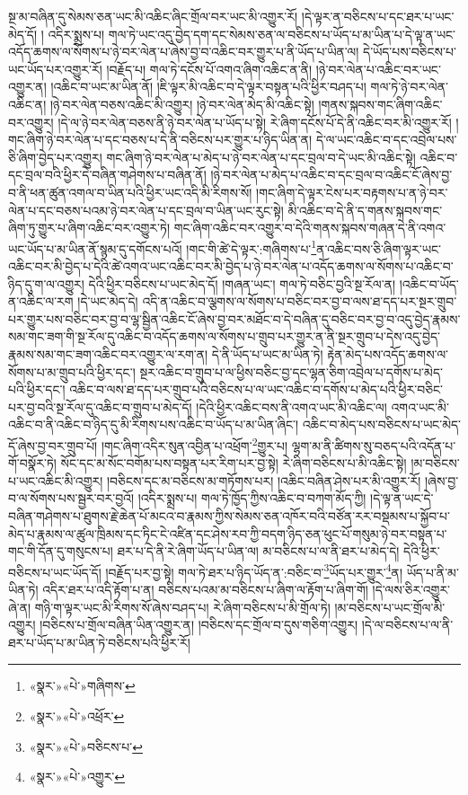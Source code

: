 སྔ་མ་བཞིན་དུ་སེམས་ཅན་ཡང་མི་འཆིང་ཞིང་གྲོལ་བར་ཡང་མི་འགྱུར་རོ། །དེ་ལྟར་ན་བཅིངས་པ་དང་ཐར་པ་ཡང་མེད་དོ། །
འདིར་སྨྲས་པ། གལ་ཏེ་ཡང་འདུ་བྱེད་དག་དང་སེམས་ཅན་ལ་བཅིངས་པ་ཡོད་པ་མ་ཡིན་པ་དེ་ལྟ་ན་ཡང་འདོད་ཆགས་ལ་སོགས་པ་ཉེ་བར་ལེན་པ་ཞེས་བྱ་བ་འཆིང་བར་གྱུར་པ་ནི་ཡོད་པ་ཡིན་ལ། དེ་ཡོད་པས་བཅིངས་པ་ཡང་ཡོད་པར་འགྱུར་རོ། །བརྗོད་པ། གལ་ཏེ་དངོས་པོ་འགའ་ཞིག་འཆིང་ན་ནི། །ཉེ་བར་ལེན་པ་འཆིང་བར་ཡང་འགྱུར་ན། །འཆིང་བ་ཡང་མ་ཡིན་ནོ། །ཇི་ལྟར་མི་འཆིང་བ་དེ་ལྟར་བསྟན་པའི་ཕྱིར་བཤད་པ། གལ་ཏེ་ཉེ་བར་ལེན་འཆིང་ན། །ཉེ་བར་ལེན་བཅས་འཆིང་མི་འགྱུར། །ཉེ་བར་ལེན་མེད་མི་འཆིང་སྟེ། །གནས་སྐབས་གང་ཞིག་འཆིང་བར་འགྱུར། །དེ་ལ་ཉེ་བར་ལེན་བཅས་ནི་ཉེ་བར་ལེན་པ་ཡོད་པ་སྟེ། རེ་ཞིག་དངོས་པོ་དེ་ནི་འཆིང་བར་མི་འགྱུར་རོ། །གང་ཞིག་ཉེ་བར་ལེན་པ་དང་བཅས་པ་དེ་ནི་བཅིངས་པར་གྱུར་པ་ཉིད་ཡིན་ན། དེ་ལ་ཡང་འཆིང་བ་དང་འབྲེལ་པས་ཅི་ཞིག་བྱེད་པར་འགྱུར། གང་ཞིག་ཉེ་བར་ལེན་པ་མེད་པ་ཉེ་བར་ལེན་པ་དང་བྲལ་བ་དེ་ཡང་མི་འཆིང་སྟེ། འཆིང་བ་དང་བྲལ་བའི་ཕྱིར་དེ་བཞིན་གཤེགས་པ་བཞིན་ནོ། །ཉེ་བར་ལེན་པ་མེད་པ་འཆིང་བ་དང་བྲལ་བ་འཆིང་ངོ་ཞེས་བྱ་བ་ནི་ཕན་ཚུན་འགལ་བ་ཡིན་པའི་ཕྱིར་ཡང་འདི་མི་རིགས་སོ། །གང་ཞིག་དེ་ལྟར་ངེས་པར་བརྟགས་པ་ན་ཉེ་བར་ལེན་པ་དང་བཅས་པའམ་ཉེ་བར་ལེན་པ་དང་བྲལ་བ་ཡིན་ཡང་རུང་སྟེ། མི་འཆིང་བ་དེ་ནི་ད་གནས་སྐབས་གང་ཞིག་ཏུ་གྱུར་པ་ཞིག་འཆིང་བར་འགྱུར་ཏེ། གང་ཞིག་འཆིང་བར་འགྱུར་བ་དེའི་གནས་སྐབས་གཞན་དེ་ནི་འགའ་ཡང་ཡོད་པ་མ་ཡིན་ནོ་སྙམ་དུ་དགོངས་པའོ། །གང་གི་ཚེ་དེ་ལྟར་:གཞིགས་པ་\footnote{«སྣར་»«པེ་»གཞིགས་}ན་འཆིང་བས་ཅི་ཞིག་ལྟར་ཡང་འཆིང་བར་མི་བྱེད་པ་དེའི་ཚེ་འགའ་ཡང་འཆིང་བར་མི་བྱེད་པ་ཉེ་བར་ལེན་པ་འདོད་ཆགས་ལ་སོགས་པ་འཆིང་བ་ཉིད་དུ་ག་ལ་འགྱུར། དེའི་ཕྱིར་བཅིངས་པ་ཡང་མེད་དོ། །གཞན་ཡང་། གལ་ཏེ་བཅིང་བྱའི་སྔ་རོལ་ན། །འཆིང་བ་ཡོད་ན་འཆིང་ལ་རག །དེ་ཡང་མེད་དེ། འདི་ན་འཆིང་བ་ལྕགས་ལ་སོགས་པ་བཅིང་བར་བྱ་བ་ལས་ཐ་དད་པར་སྔར་གྲུབ་པར་གྱུར་པས་བཅིང་བར་བྱ་བ་ལྷ་སྦྱིན་འཆིང་ངོ་ཞེས་བྱ་བར་མཐོང་བ་དེ་བཞིན་དུ་བཅིང་བར་བྱ་བ་འདུ་བྱེད་རྣམས་སམ་གང་ཟག་གི་སྔ་རོལ་དུ་འཆིང་བ་འདོད་ཆགས་ལ་སོགས་པ་གྲུབ་པར་གྱུར་ན་ནི་སྔར་གྲུབ་པ་དེས་འདུ་བྱེད་རྣམས་སམ་གང་ཟག་འཆིང་བར་འགྱུར་ལ་རག་ན། དེ་ནི་ཡོད་པ་ཡང་མ་ཡིན་ཏེ། རྟེན་མེད་པས་འདོད་ཆགས་ལ་སོགས་པ་མ་གྲུབ་པའི་ཕྱིར་དང་། སྔར་འཆིང་བ་གྲུབ་པ་ལ་ཕྱིས་བཅིང་བྱ་དང་ལྷན་ཅིག་འབྲེལ་པ་དགོས་པ་མེད་པའི་ཕྱིར་དང་། འཆིང་བ་ལས་ཐ་དད་པར་གྲུབ་པའི་བཅིངས་པ་ལ་ཡང་འཆིང་བ་དགོས་པ་མེད་པའི་ཕྱིར་བཅིང་པར་བྱ་བའི་སྔ་རོལ་དུ་འཆིང་བ་གྲུབ་པ་མེད་དོ། །དེའི་ཕྱིར་འཆིང་བས་ནི་འགའ་ཡང་མི་འཆིང་ལ། འགའ་ཡང་མི་འཆིང་བ་ནི་འཆིང་བ་ཉིད་དུ་མི་རིགས་པས་འཆིང་བ་ཡོད་པ་མ་ཡིན་ཞིང་། འཆིང་བ་མེད་པས་བཅིངས་པ་ཡང་མེད་དོ་ཞེས་བྱ་བར་གྲུབ་པོ། །གང་ཞིག་འདིར་སུན་འབྱིན་པ་འཕྲོག་\footnote{«སྣར་»«པེ་»འཕྲོར་}གྱུར་པ། ལྷག་མ་ནི་ཚིགས་སུ་བཅད་པའི་འདོན་པ་གོ་བསྣོར་ཏེ། སོང་དང་མ་སོང་བགོམ་པས་བསྟན་པར་རིག་པར་བྱ་སྟེ། རེ་ཞིག་བཅིངས་པ་མི་འཆིང་སྟེ། །མ་བཅིངས་པ་ཡང་འཆིང་མི་འགྱུར། །བཅིངས་དང་མ་བཅིངས་མ་གཏོགས་པར། །འཆིང་བཞིན་ཤེས་པར་མི་འགྱུར་རོ། །ཞེས་བྱ་བ་ལ་སོགས་པས་སྦྱར་བར་བྱའོ། །འདིར་སྨྲས་པ། གལ་ཏེ་ཁྱོད་ཀྱིས་འཆིང་བ་བཀག་མོད་ཀྱི། །དེ་ལྟ་ན་ཡང་དེ་བཞིན་གཤེགས་པ་ཐུགས་རྗེ་ཆེན་པོ་མངའ་བ་རྣམས་ཀྱིས་སེམས་ཅན་འཁོར་བའི་བཙོན་རར་བསྡམས་པ་སྐྱོབ་པ་མེད་པ་རྣམས་ལ་ཚུལ་ཁྲིམས་དང་ཏིང་ངེ་འཛིན་དང་ཤེས་རབ་ཀྱི་བདག་ཉིད་ཅན་ཕུང་པོ་གསུམ་ཉེ་བར་བསྟན་པ་གང་གི་དོན་དུ་གསུངས་པ། ཐར་པ་དེ་ནི་རེ་ཞིག་ཡོད་པ་ཡིན་ལ། མ་བཅིངས་པ་ལ་ནི་ཐར་པ་མེད་དེ། དེའི་ཕྱིར་བཅིངས་པ་ཡང་ཡོད་དོ། །བརྗོད་པར་བྱ་སྟེ། གལ་ཏེ་ཐར་པ་ཉིད་ཡོད་ན་:བཅིང་བ་\footnote{«སྣར་»«པེ་»བཅིངས་པ་}ཡོད་པར་གྱུར་\footnote{«སྣར་»«པེ་»འགྱུར་}ན། ཡོད་པ་ནི་མ་ཡིན་ཏེ། འདིར་ཐར་པ་འདི་རྟོག་པ་ན། བཅིངས་པའམ་མ་བཅིངས་པ་ཞིག་ལ་རྟོག་པ་ཞིག་གོ། །དེ་ལས་ཅིར་འགྱུར་ཞེ་ན། གཉི་ག་ལྟར་ཡང་མི་རིགས་སོ་ཞེས་བཤད་པ། རེ་ཞིག་བཅིངས་པ་མི་གྲོལ་ཏེ། །མ་བཅིངས་པ་ཡང་གྲོལ་མི་འགྱུར། །བཅིངས་པ་གྲོལ་བཞིན་ཡིན་འགྱུར་ན། །བཅིངས་དང་གྲོལ་བ་དུས་གཅིག་འགྱུར། །དེ་ལ་བཅིངས་པ་ལ་ནི་ཐར་པ་ཡོད་པ་མ་ཡིན་ཏེ་བཅིངས་པའི་ཕྱིར་རོ། 